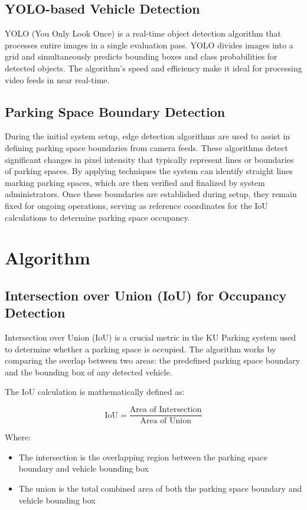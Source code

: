 \subsection{YOLO-based Vehicle Detection}
YOLO (You Only Look Once) is a real-time object detection algorithm that processes entire images in a single evaluation pass.
YOLO divides images into a grid and simultaneously predicts bounding boxes and class probabilities for detected objects. 
The algorithm's speed and efficiency make it ideal for processing video feeds in near real-time.\ \cite{YOLO}

\subsection{Parking Space Boundary Detection}
During the initial system setup, edge detection algorithms are used to assist in defining parking space boundaries from camera feeds. 
These algorithms detect significant changes in pixel intensity that typically represent lines or boundaries of parking spaces. 
By applying techniques the system can identify straight lines marking parking spaces, 
which are then verified and finalized by system administrators. Once these boundaries are established during setup, 
they remain fixed for ongoing operations, serving as reference coordinates for the IoU calculations to determine parking space occupancy.

\section{Algorithm}
\label{section:algorithm}
\subsection{Intersection over Union (IoU) for Occupancy Detection}
Intersection over Union (IoU) is a crucial metric in the KU Parking system used to determine whether a parking space is occupied. 
The algorithm works by comparing the overlap between two areas: the predefined parking space boundary and the bounding box of any detected vehicle.\ \cite{barseghyan2023parking}

The IoU calculation is mathematically defined as:

\[
\text{IoU} = \frac{\text{Area of Intersection}}{\text{Area of Union}}
\]

Where:
\begin{itemize}
    \item The intersection is the overlapping region between the parking space boundary and vehicle bounding box
    \item The union is the total combined area of both the parking space boundary and vehicle bounding box
\end{itemize}

